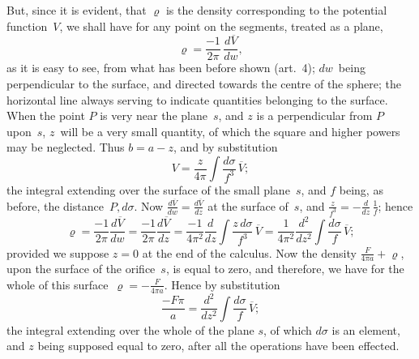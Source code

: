 \documentclass[12pt,notitlepage]{amsart}
\renewcommand{\rho}{\varrho}
\begin{document}
But, since it is evident, that $\rho$ is the density corresponding to the 
potential function~$V$, we shall have for any point on the segments,
treated as a plane,
\[
\rho=\frac{-1}{2\pi}\,\frac{d\overline{V}}{dw},
\]
as it is easy to see, from what has been before shown (art.~4); $dw$~being
perpendicular to the surface, and directed towards the centre of the sphere;
the horizontal line always serving to indicate quantities belonging to the 
surface. When the point $P$ is very near the plane~$s$,
and $z$ is a perpendicular
from $P$ upon~$s$, $z$~will be a very small quantity, of which the square and
higher powers may be neglected. Thus $b=a-z$, and by substitution
\[
V=\frac{z}{4\pi}\int\frac{d\sigma}{f^3}\,\overline{V};
\]
the integral extending over the surface of the small plane~$s$,
and $f$ being, as before,
the distance~$P,d\sigma$.
Now $\frac{d\overline{V}}{dw}=\frac{d\overline{V}}{dz}$
at the surface of~$s$, and $\frac{z}{f^3}=-\frac{d}{dz}\,\frac1f$; hence
\[
\rho=\frac{-1}{2\pi}\frac{d\overline{V}}{dw}
=\frac{-1}{2\pi}\frac{d\overline{V}}{dz}
=\frac{-1}{4\pi^2}\frac{d}{dz}\int\frac{z\,d\sigma}{f^3}\,\overline{V}
=\frac{1}{4\pi^2}\frac{d^2}{dz^2}\int\frac{d\sigma}{f}\,\overline{V};
\]
provided we suppose $z=0$ at the end of the calculus. Now the density
$\frac{F}{4\pi a}+\rho$,
upon the surface of the orifice~$s$, is equal to zero, and therefore,
we have for the whole of this surface~$\rho=-\frac{F}{4\pi a}$.
Hence by substitution
\[
\tag{12.}
\frac{-F\pi}{a}=
\frac{d^2}{dz^2}\int\frac{d\sigma}{f}\,\overline{V};
\]
the integral extending over the whole of the plane $s$,
of which $d\sigma$ is an
element, and $z$ being supposed equal to zero, after all the operations have
been effected.
\end{document}
